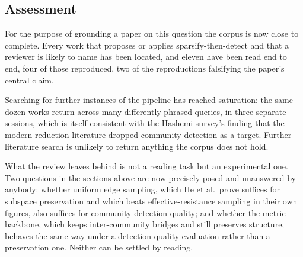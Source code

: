 \documentclass[10pt,a4paper]{article}
\begin{document}
\subsection*{Assessment}

For the purpose of grounding a paper on this question the corpus is now close to complete. Every
work that proposes or applies sparsify-then-detect and that a reviewer is likely to name has been
located, and eleven have been read end to end, four of those reproduced, two of the reproductions
falsifying the paper's central claim.

Searching for further instances of the pipeline has reached saturation: the same dozen works
return across many differently-phrased queries, in three separate sessions, which is itself
consistent with the Hashemi survey's finding that the modern reduction literature dropped
community detection as a target. Further literature search is unlikely to return anything the
corpus does not hold.

What the review leaves behind is not a reading task but an experimental one. Two questions in the
sections above are now precisely posed and unanswered by anybody: whether uniform edge sampling,
which He et al.\ prove suffices for subspace preservation and which beats effective-resistance
sampling in their own figures, also suffices for community detection quality; and whether the
metric backbone, which keeps inter-community bridges and still preserves structure, behaves the
same way under a detection-quality evaluation rather than a preservation one. Neither can be
settled by reading.



\end{document}

